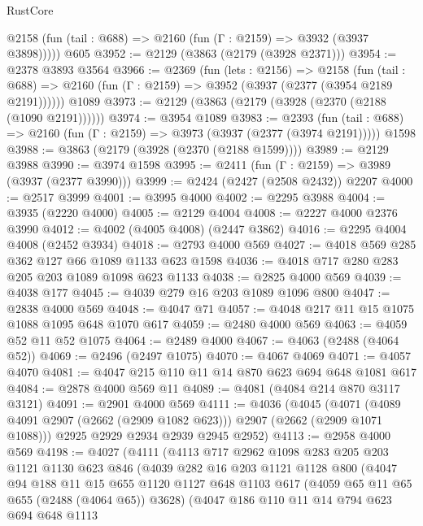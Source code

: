 \begin{lexlean}{RustCore}
\begin{coremodule}
      @2158 (fun (tail : @688) => @2160 (fun (Γ : @2159) => @3932 (@3937 @3898)))))
    @605
@3952 := @2129 (@3863 (@2179 (@3928 @2371)))
@3954 := @2378 @3893 @3564
@3966 := @2369
    (fun (lets : @2156) =>
    @2158
      (fun (tail : @688) => @2160 (fun (Γ : @2159) => @3952 (@3937 (@2377 (@3954 @2189 @2191))))))
    @1089
@3973 := @2129 (@3863 (@2179 (@3928 (@2370 (@2188 (@1090 @2191))))))
@3974 := @3954 @1089
@3983 := @2393
    (fun (tail : @688) => @2160 (fun (Γ : @2159) => @3973 (@3937 (@2377 (@3974 @2191)))))
    @1598
@3988 := @3863 (@2179 (@3928 (@2370 (@2188 @1599))))
@3989 := @2129 @3988
@3990 := @3974 @1598
@3995 := @2411 (fun (Γ : @2159) => @3989 (@3937 (@2377 @3990)))
@3999 := @2424 (@2427 (@2508 @2432)) @2207
@4000 := @2517 @3999
@4001 := @3995 @4000
@4002 := @2295 @3988
@4004 := @3935 (@2220 @4000)
@4005 := @2129 @4004
@4008 := @2227 @4000 @2376 @3990
@4012 := @4002 (@4005 @4008) (@2447 @3862)
@4016 := @2295 @4004 @4008 (@2452 @3934)
@4018 := @2793 @4000 @569
@4027 := @4018 @569 @285 @362 @127 @66 @1089 @1133 @623 @1598
@4036 := @4018 @717 @280 @283 @205 @203 @1089 @1098 @623 @1133
@4038 := @2825 @4000 @569
@4039 := @4038 @177
@4045 := @4039 @279 @16 @203 @1089 @1096 @800
@4047 := @2838 @4000 @569
@4048 := @4047 @71
@4057 := @4048 @217 @11 @15 @1075 @1088 @1095 @648 @1070 @617
@4059 := @2480 @4000 @569
@4063 := @4059 @52 @11 @52 @1075
@4064 := @2489 @4000
@4067 := @4063 (@2488 (@4064 @52))
@4069 := @2496 (@2497 @1075)
@4070 := @4067 @4069
@4071 := @4057 @4070
@4081 := @4047 @215 @110 @11 @14 @870 @623 @694 @648 @1081 @617
@4084 := @2878 @4000 @569 @11
@4089 := @4081 (@4084 @214 @870 @3117 @3121)
@4091 := @2901 @4000 @569
@4111 := @4036
    (@4045
      (@4071 (@4089 @4091 @2907 (@2662 (@2909 @1082 @623))) @2907 (@2662 (@2909 @1071 @1088)))
      @2925
      @2929
      @2934
      @2939
      @2945
      @2952)
@4113 := @2958 @4000 @569
@4198 := @4027
    (@4111
      (@4113
        @717
        @2962
        @1098
        @283
        @205
        @203
        @1121
        @1130
        @623
        @846
        (@4039
          @282
          @16
          @203
          @1121
          @1128
          @800
          (@4047
            @94
            @188
            @11
            @15
            @655
            @1120
            @1127
            @648
            @1103
            @617
            (@4059 @65 @11 @65 @655 (@2488 (@4064 @65)) @3628)
            (@4047
              @186
              @110
              @11
              @14
              @794
              @623
              @694
              @648
              @1113

\end{coremodule}
\end{lexlean}

